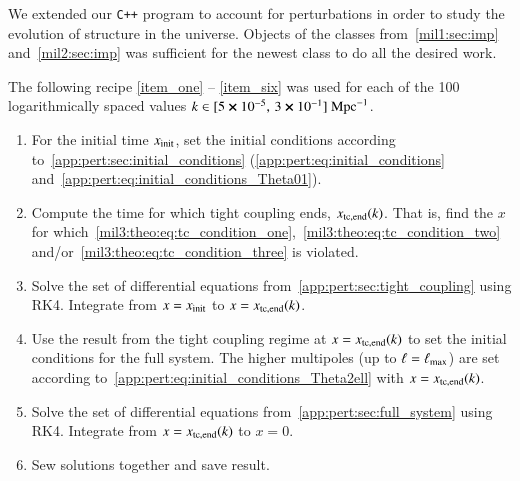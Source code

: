 


We extended our \verb|C++| program to account for perturbations in order to study the evolution of structure in the universe. Objects of the classes from~\cref{mil1:sec:imp} and~\cref{mil2:sec:imp} was sufficient for the newest class to do all the desired work. 



The following recipe \ref{item_one} -- \ref{item_six} was used for each of the 100 logarithmically spaced values $k \in [5\cross10^{-5}, \,3\cross 10^{-1}]~\mathrm{Mpc}^{-1}$.

\begin{enumerate}[wide,labelwidth=!,labelindent=0pt,label=(\roman*)]
    \item\label{item_one} 
    For the initial time $x_\mathrm{init}$, set the initial conditions according to~\cref{app:pert:sec:initial_conditions} (\cref{app:pert:eq:initial_conditions} and~\eqref{app:pert:eq:initial_conditions_Theta01}). 

    \item\label{item_two} 
    
    Compute the time for which tight coupling ends, $x_\mathrm{tc,end}(k)$. That is, find the $x$ for which~\cref{mil3:theo:eq:tc_condition_one},~\eqref{mil3:theo:eq:tc_condition_two} and/or~\eqref{mil3:theo:eq:tc_condition_three} is violated. 
    
    \item\label{item_three}
    
    Solve the set of differential equations from~\cref{app:pert:sec:tight_coupling} using RK4. Integrate from $x=x_\mathrm{init}$ to $x=x_\mathrm{tc,end}(k)$.

    \item\label{item_four}
    
    Use the result from the tight coupling regime at $x=x_\mathrm{tc,end}(k)$ to set the initial conditions for the full system. The higher multipoles (up to $\ell=\ell_\mathrm{max}$) are set according to~\cref{app:pert:eq:initial_conditions_Theta2ell} with $x=x_\mathrm{tc,end}(k)$. 

    \item\label{item_five}
    
    Solve the set of differential equations from~\cref{app:pert:sec:full_system} using RK4. Integrate from $x=x_\mathrm{tc,end}(k)$ to $x=0$. 

    \item\label{item_six}
    
    Sew solutions together and save result.

\end{enumerate}

